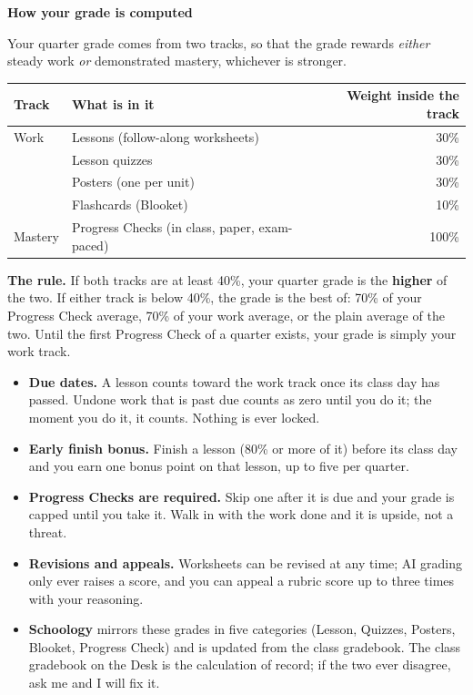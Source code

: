 \documentclass[10pt]{article}
\newcommand{\banner}[1]{%
  \vspace{4pt}\begin{tcolorbox}[enhanced, boxrule=0pt, arc=1pt, colback=dayblue, left=6pt, right=6pt, top=3pt, bottom=3pt]
  {\color{white}\bfseries\large #1}\end{tcolorbox}\vspace{-2pt}}
\begin{document}
\banner{How your grade is computed}
Your quarter grade comes from two tracks, so that the grade rewards \emph{either} steady work \emph{or} demonstrated mastery,
whichever is stronger.

\begin{center}\small
\begin{tabular}{@{}llr@{}}
\toprule
\textbf{Track} & \textbf{What is in it} & \textbf{Weight inside the track} \\
\midrule
Work & Lessons (follow-along worksheets)   & 30\% \\
     & Lesson quizzes                      & 30\% \\
     & Posters (one per unit)              & 30\% \\
     & Flashcards (Blooket)                & 10\% \\
\midrule
Mastery & Progress Checks (in class, paper, exam-paced) & 100\% \\
\bottomrule
\end{tabular}
\end{center}

\begin{tcolorbox}[enhanced, colback=callout, colframe=dayblue, boxrule=0.6pt, arc=2pt, left=7pt, right=7pt, top=4pt, bottom=4pt]
\textbf{The rule.} If both tracks are at least 40\%, your quarter grade is the \textbf{higher} of the two.
If either track is below 40\%, the grade is the best of: 70\% of your Progress Check average, 70\% of your work average,
or the plain average of the two. Until the first Progress Check of a quarter exists, your grade is simply your work track.
\end{tcolorbox}

\begin{itemize}[leftmargin=1.4em, itemsep=1pt, topsep=2pt]
  \item \textbf{Due dates.} A lesson counts toward the work track once its class day has passed. Undone work that is past due
        counts as zero until you do it; the moment you do it, it counts. Nothing is ever locked.
  \item \textbf{Early finish bonus.} Finish a lesson (80\% or more of it) before its class day and you earn one bonus point on
        that lesson, up to five per quarter.
  \item \textbf{Progress Checks are required.} Skip one after it is due and your grade is capped until you take it. Walk in
        with the work done and it is upside, not a threat.
  \item \textbf{Revisions and appeals.} Worksheets can be revised at any time; AI grading only ever raises a score, and you can
        appeal a rubric score up to three times with your reasoning.
  \item \textbf{Schoology} mirrors these grades in five categories (Lesson, Quizzes, Posters, Blooket, Progress Check) and is
        updated from the class gradebook. The class gradebook on the Desk is the calculation of record; if the two ever
        disagree, ask me and I will fix it.
\end{itemize}
\end{document}
